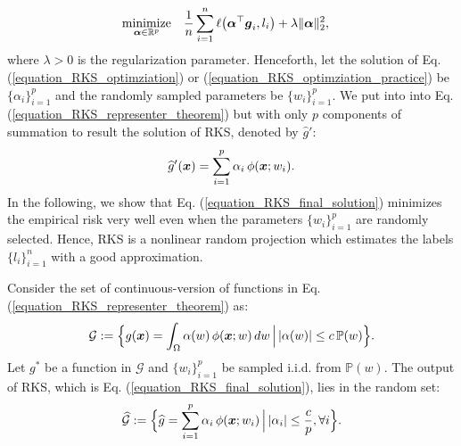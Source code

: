 \documentclass{article}
\newtheorem{lemma}{Lemma}
\def\b{\ensuremath\boldsymbol}
\begin{document}
\begin{equation}\label{equation_RKS_optimziation_practice}
\begin{aligned}
& \underset{\b{\alpha} \in \mathbb{R}^p}{\text{minimize}}
& & \frac{1}{n} \sum_{i=1}^n \ell\big(\b{\alpha}^\top \b{g}_i, l_i\big) + \lambda\|\b{\alpha}\|_2^2,
\end{aligned}
\end{equation}
where $\lambda >0$ is the regularization parameter. 
Henceforth, let the solution of Eq. (\ref{equation_RKS_optimziation}) or (\ref{equation_RKS_optimziation_practice}) be $\{\alpha_i\}_{i=1}^p$ and the randomly sampled parameters be $\{w_i\}_{i=1}^p$.
We put into into Eq. (\ref{equation_RKS_representer_theorem}) but with only $p$ components of summation to result the solution of RKS, denoted by $\widehat{g}'$:
\begin{align}\label{equation_RKS_final_solution}
\widehat{g}'(\b{x}) = \sum_{i=1}^p \alpha_i\, \phi(\b{x}; w_i).
\end{align}
In the following, we show that Eq. (\ref{equation_RKS_final_solution}) minimizes the empirical risk very well even when the parameters $\{w_i\}_{i=1}^p$ are randomly selected. Hence, RKS is a nonlinear random projection which estimates the labels $\{l_i\}_{i=1}^n$ with a good approximation. 

Consider the set of continuous-version of functions in Eq. (\ref{equation_RKS_representer_theorem}) as:
\begin{align}
\mathcal{G} := \Big\{g(\b{x}) = \int_\Omega \alpha(w)\, \phi(\b{x}; w)\, dw \, \Big| \, |\alpha(w)| \leq c\, \mathbb{P}(w) \Big\}.
\end{align}
Let $g^*$ be a function in $\mathcal{G}$ and $\{w_i\}_{i=1}^p$ be sampled i.i.d. from $\mathbb{P}(w)$. 
The output of RKS, which is Eq. (\ref{equation_RKS_final_solution}), lies in the random set:
\begin{align}
\widehat{\mathcal{G}} := \Big\{\widehat{g} = \sum_{i=1}^p \alpha_i\, \phi(\b{x}; w_i)\, \Big| \, |\alpha_i| \leq \frac{c}{p}, \forall i \Big\}.
\end{align}


\end{document}
